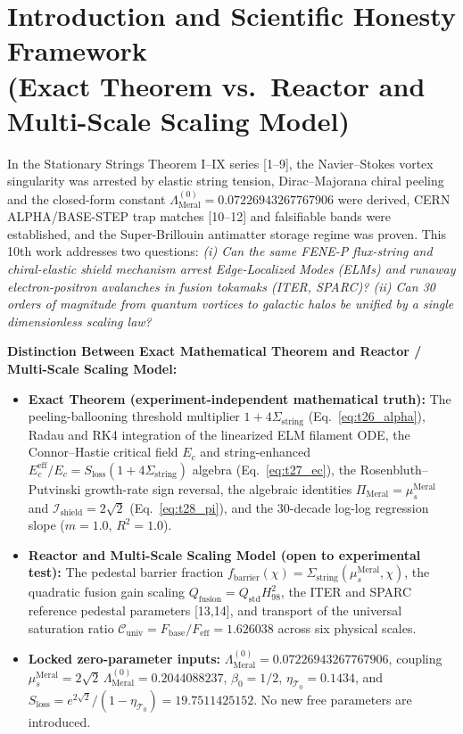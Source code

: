 \documentclass[12pt,a4paper]{article}
\begin{document}
\section[Introduction and Scientific Honesty Framework]{Introduction and Scientific Honesty Framework \\ (Exact Theorem vs.\ Reactor and Multi-Scale Scaling Model)}

In the Stationary Strings Theorem I--IX series [1--9], the Navier--Stokes vortex singularity was arrested by elastic string tension, Dirac--Majorana chiral peeling and the closed-form constant $\Lambda_{\mathrm{Meral}}^{(0)} = 0.07226943267767906$ were derived, CERN ALPHA/BASE-STEP trap matches [10--12] and falsifiable bands were established, and the Super-Brillouin antimatter storage regime was proven. This 10th work addresses two questions: \textit{(i) Can the same FENE-P flux-string and chiral-elastic shield mechanism arrest Edge-Localized Modes (ELMs) and runaway electron-positron avalanches in fusion tokamaks (ITER, SPARC)? (ii) Can 30 orders of magnitude from quantum vortices to galactic halos be unified by a single dimensionless scaling law?}

\textbf{Distinction Between Exact Mathematical Theorem and Reactor / Multi-Scale Scaling Model:}
\begin{itemize}
    \item \textbf{Exact Theorem (experiment-independent mathematical truth):} The peeling-ballooning threshold multiplier $1+4\Sigma_{\mathrm{string}}$ (Eq.~\ref{eq:t26_alpha}), Radau and RK4 integration of the linearized ELM filament ODE, the Connor--Hastie critical field $E_c$ and string-enhanced $E_c^{\mathrm{eff}}/E_c = S_{\mathrm{loss}}(1+4\Sigma_{\mathrm{string}})$ algebra (Eq.~\ref{eq:t27_ec}), the Rosenbluth--Putvinski growth-rate sign reversal, the algebraic identities $\Pi_{\mathrm{Meral}} = \mu_s^{\mathrm{Meral}}$ and $\mathcal{I}_{\mathrm{shield}} = 2\sqrt{2}$ (Eq.~\ref{eq:t28_pi}), and the 30-decade log-log regression slope ($m = 1.0$, $R^2=1.0$).
    \item \textbf{Reactor and Multi-Scale Scaling Model (open to experimental test):} The pedestal barrier fraction $f_{\mathrm{barrier}}(\chi) = \Sigma_{\mathrm{string}}(\mu_s^{\mathrm{Meral}},\chi)$, the quadratic fusion gain scaling $Q_{\mathrm{fusion}} = Q_{\mathrm{std}} H_{98}^2$, the ITER and SPARC reference pedestal parameters [13,14], and transport of the universal saturation ratio $\mathcal{C}_{\mathrm{univ}} = F_{\mathrm{base}}/F_{\mathrm{eff}} = 1.626038$ across six physical scales.
    \item \textbf{Locked zero-parameter inputs:} $\Lambda_{\mathrm{Meral}}^{(0)} = 0.07226943267767906$, coupling $\mu_s^{\mathrm{Meral}} = 2\sqrt{2}\,\Lambda_{\mathrm{Meral}}^{(0)} = 0.2044088237$, $\beta_0 = 1/2$, $\eta_{\mathcal{T}_0} = 0.1434$, and $S_{\mathrm{loss}} = e^{2\sqrt{2}}/(1-\eta_{\mathcal{T}_0}) = 19.7511425152$. No new free parameters are introduced.
\end{itemize}
\end{document}
